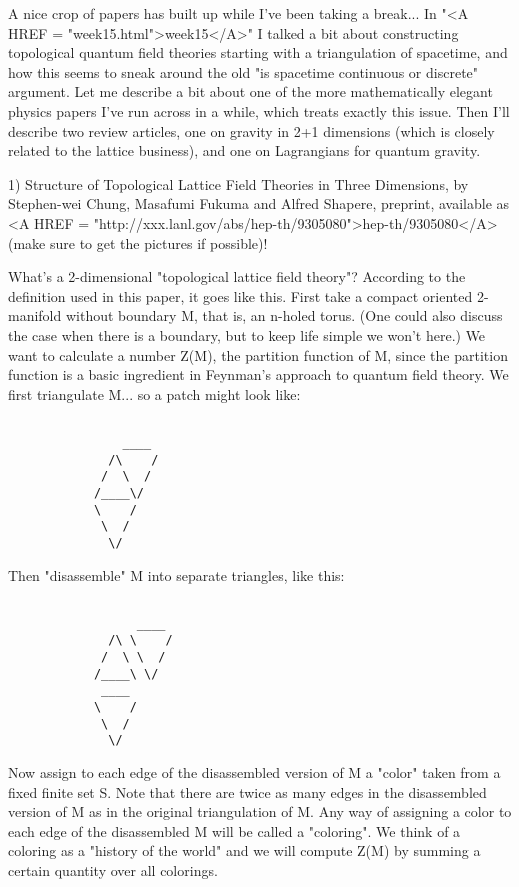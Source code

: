 

A nice crop of papers has built up while I've been taking a break...
In "<A HREF = "week15.html">week15</A>" I talked a bit about constructing topological quantum field
theories starting with a triangulation of spacetime, and how this seems
to sneak around the old "is spacetime continuous or discrete" argument.
Let me describe a bit about one of the more mathematically elegant
physics papers I've run across in a while, which treats exactly this
issue.  Then I'll describe two review articles, one on gravity in 2+1
dimensions (which is closely related to the lattice business), and one
on Lagrangians for quantum gravity.

1)  Structure of Topological Lattice Field Theories in Three Dimensions, by
Stephen-wei Chung, Masafumi Fukuma and Alfred Shapere, preprint,
available as <A HREF = "http://xxx.lanl.gov/abs/hep-th/9305080">hep-th/9305080</A> (make sure to get the pictures if possible)! 

What's a 2-dimensional "topological lattice field theory"?  According to the
definition used in this paper, it goes like this.  First take a compact
oriented 2-manifold without boundary M, that is, an n-holed torus.
(One could also discuss the case when there is a boundary, but to keep
life simple we won't here.)  We want to calculate a number Z(M), the
partition function of M, since the partition function is a basic ingredient
in Feynman's approach to quantum field theory.   We first triangulate
M... so a patch might look like:


\begin{verbatim}

                ____
              /\    /
             /  \  /
            /____\/ 
            \    /   
             \  /          
              \/     
\end{verbatim}
    

Then "disassemble" M into separate triangles, like this:


\begin{verbatim}

                  ____
              /\ \    /
             /  \ \  /
            /____\ \/
             ____ 
            \    /   
             \  /          
              \/     
\end{verbatim}
    

Now assign to each edge of the disassembled version of M a "color"
taken from a fixed finite set S.  Note that there are twice as many
edges in the disassembled version of M as in the original triangulation
of M.   Any way of assigning a color to each edge of the disassembled M
will be called a "coloring".  We think of a coloring as a "history of
the world" and we will compute Z(M) by summing a certain quantity
over all colorings.  

